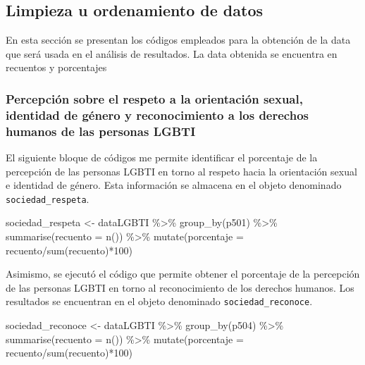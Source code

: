 \documentclass[
]{book}
\newenvironment{Shaded}{\begin{snugshade}}{\end{snugshade}}
\newcommand{\AttributeTok}[1]{\textcolor[rgb]{0.77,0.63,0.00}{#1}}
\newcommand{\DecValTok}[1]{\textcolor[rgb]{0.00,0.00,0.81}{#1}}
\newcommand{\FunctionTok}[1]{\textcolor[rgb]{0.00,0.00,0.00}{#1}}
\newcommand{\NormalTok}[1]{#1}
\newcommand{\OtherTok}[1]{\textcolor[rgb]{0.56,0.35,0.01}{#1}}
\newcommand{\SpecialCharTok}[1]{\textcolor[rgb]{0.00,0.00,0.00}{#1}}
\theoremstyle{definition}
\theoremstyle{definition}
\theoremstyle{definition}
\theoremstyle{definition}
\theoremstyle{remark}
\begin{document}
\hypertarget{limpieza-u-ordenamiento-de-datos}{%
\subsection{Limpieza u ordenamiento de datos}\label{limpieza-u-ordenamiento-de-datos}}

En esta sección se presentan los códigos empleados para la obtención de la data que será usada en el análisis de resultados. La data obtenida se encuentra en recuentos y porcentajes

\hypertarget{percepciuxf3n-sobre-el-respeto-a-la-orientaciuxf3n-sexual-identidad-de-guxe9nero-y-reconocimiento-a-los-derechos-humanos-de-las-personas-lgbti}{%
\subsubsection{Percepción sobre el respeto a la orientación sexual, identidad de género y reconocimiento a los derechos humanos de las personas LGBTI}\label{percepciuxf3n-sobre-el-respeto-a-la-orientaciuxf3n-sexual-identidad-de-guxe9nero-y-reconocimiento-a-los-derechos-humanos-de-las-personas-lgbti}}

El siguiente bloque de códigos me permite identificar el porcentaje de la percepción de las personas LGBTI en torno al respeto hacia la orientación sexual e identidad de género. Esta información se almacena en el objeto denominado \texttt{sociedad\_respeta}.

\begin{Shaded}
\begin{Highlighting}[]
\NormalTok{sociedad\_respeta }\OtherTok{\textless{}{-}}\NormalTok{ dataLGBTI }\SpecialCharTok{\%\textgreater{}\%} 
  \FunctionTok{group\_by}\NormalTok{(p501) }\SpecialCharTok{\%\textgreater{}\%} 
  \FunctionTok{summarise}\NormalTok{(}\AttributeTok{recuento =} \FunctionTok{n}\NormalTok{()) }\SpecialCharTok{\%\textgreater{}\%} 
  \FunctionTok{mutate}\NormalTok{(}\AttributeTok{porcentaje =}\NormalTok{ recuento}\SpecialCharTok{/}\FunctionTok{sum}\NormalTok{(recuento)}\SpecialCharTok{*}\DecValTok{100}\NormalTok{)}
\end{Highlighting}
\end{Shaded}

Asimismo, se ejecutó el código que permite obtener el porcentaje de la percepción de las personas LGBTI en torno al reconocimiento de los derechos humanos. Los resultados se encuentran en el objeto denominado \texttt{sociedad\_reconoce}.

\begin{Shaded}
\begin{Highlighting}[]
\NormalTok{sociedad\_reconoce }\OtherTok{\textless{}{-}}\NormalTok{ dataLGBTI }\SpecialCharTok{\%\textgreater{}\%} 
  \FunctionTok{group\_by}\NormalTok{(p504) }\SpecialCharTok{\%\textgreater{}\%} 
  \FunctionTok{summarise}\NormalTok{(}\AttributeTok{recuento =} \FunctionTok{n}\NormalTok{()) }\SpecialCharTok{\%\textgreater{}\%} 
  \FunctionTok{mutate}\NormalTok{(}\AttributeTok{porcentaje =}\NormalTok{ recuento}\SpecialCharTok{/}\FunctionTok{sum}\NormalTok{(recuento)}\SpecialCharTok{*}\DecValTok{100}\NormalTok{)}
\end{Highlighting}
\end{Shaded}
\end{document}
